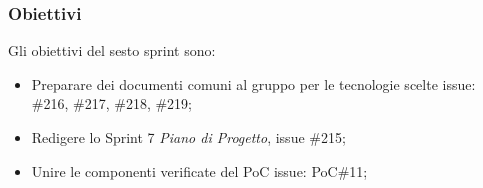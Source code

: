 \subsubsection{Obiettivi}
\label{sec:sprint7_obiettivi}
Gli obiettivi del sesto sprint sono:
\begin{itemize}
    \item Preparare dei documenti comuni al gruppo per le tecnologie scelte issue: \#216, \#217, \#218, \#219;
    \item Redigere lo Sprint 7 \textit{Piano di Progetto}, issue \#215;
    \item Unire le componenti verificate del PoC issue: PoC\#11;
\end{itemize}